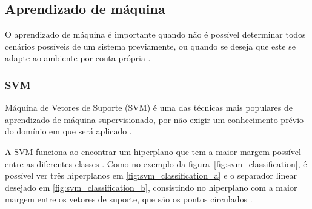 \subsection{Aprendizado de máquina}
O aprendizado de máquina é importante quando não é possível determinar todos cenários possíveis de um sistema previamente, ou quando se deseja que este se adapte ao ambiente por conta própria \cite{russell:2010}. %


\subsubsection{SVM}
Máquina de Vetores de Suporte (SVM) é uma das técnicas mais populares de aprendizado de máquina supervisionado, por não exigir um conhecimento prévio do domínio em que será aplicado \cite{russell:2010}.

A SVM funciona ao encontrar um hiperplano que tem a maior margem possível entre as diferentes classes \cite{hearst:1998}. Como no exemplo da figura~\ref{fig:svm_classification}, é possível ver três hiperplanos em \ref{fig:svm_classification_a} e o separador linear desejado em \ref{fig:svm_classification_b}, consistindo no hiperplano com a maior margem entre os vetores de suporte, que são os pontos circulados \cite{russell:2010}.


